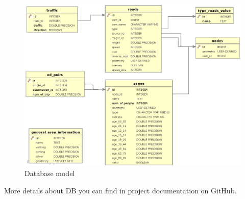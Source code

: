 \begin{figure}
\centering
\includegraphics[width=15cm]{img/c01-transp-model/db.eps}
\caption{Database model}
\end{figure}

More details about DB you can find in project documentation on GitHub.
